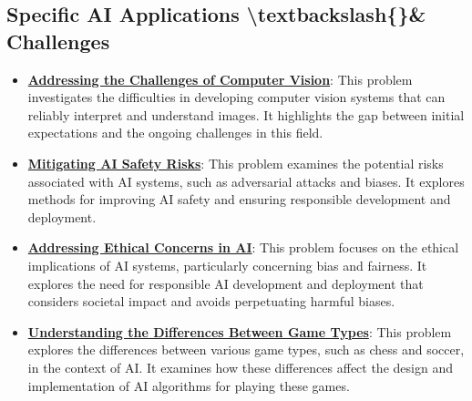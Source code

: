 \documentclass{article}%
\begin{document}
\subsection{Specific AI Applications \textbackslash{}textbackslash\{\}\& Challenges}%
\label{subsec:SpecificAIApplicationstextbackslashChallenges}%
\begin{itemize}[leftmargin=*]%
\item \href{https://purdue.brightspace.com/d2l/common/assets/pdfjs-d2l-dist/1.0.14-legacy/web/viewer.html?file=\%2Fcontent\%2Fenforced\%2F1095467-wl.202510.CS.24300.001\%2F02L2-Intro.pdf\%3Fou\%3D1095467\&lang=en-us\&container=d2l-fileviewer-rendered-pdf\&fullscreen=d2l-fileviewer-rendered-pdf-dialog\&height=667#page=15}{\textbf{Addressing the Challenges of Computer Vision}}: This problem investigates the difficulties in developing computer vision systems that can reliably interpret and understand images. It highlights the gap between initial expectations and the ongoing challenges in this field.%
\item \href{https://purdue.brightspace.com/d2l/common/assets/pdfjs-d2l-dist/1.0.14-legacy/web/viewer.html?file=\%2Fcontent\%2Fenforced\%2F1095467-wl.202510.CS.24300.001\%2F02L2-Intro.pdf\%3Fou\%3D1095467\&lang=en-us\&container=d2l-fileviewer-rendered-pdf\&fullscreen=d2l-fileviewer-rendered-pdf-dialog\&height=667#page=19}{\textbf{Mitigating AI Safety Risks}}: This problem examines the potential risks associated with AI systems, such as adversarial attacks and biases. It explores methods for improving AI safety and ensuring responsible development and deployment.%
\item \href{https://purdue.brightspace.com/d2l/common/assets/pdfjs-d2l-dist/1.0.14-legacy/web/viewer.html?file=\%2Fcontent\%2Fenforced\%2F1095467-wl.202510.CS.24300.001\%2F02L2-Intro.pdf\%3Fou\%3D1095467\&lang=en-us\&container=d2l-fileviewer-rendered-pdf\&fullscreen=d2l-fileviewer-rendered-pdf-dialog\&height=667#page=20}{\textbf{Addressing Ethical Concerns in AI}}: This problem focuses on the ethical implications of AI systems, particularly concerning bias and fairness. It explores the need for responsible AI development and deployment that considers societal impact and avoids perpetuating harmful biases.%
\item \href{https://purdue.brightspace.com/d2l/common/assets/pdfjs-d2l-dist/1.0.14-legacy/web/viewer.html?file=\%2Fcontent\%2Fenforced\%2F1095467-wl.202510.CS.24300.001\%2F02L2-Intro.pdf\%3Fou\%3D1095467\&lang=en-us\&container=d2l-fileviewer-rendered-pdf\&fullscreen=d2l-fileviewer-rendered-pdf-dialog\&height=667#page=27}{\textbf{Understanding the Differences Between Game Types}}: This problem explores the differences between various game types, such as chess and soccer, in the context of AI. It examines how these differences affect the design and implementation of AI algorithms for playing these games.%

\end{itemize}
\end{document}
